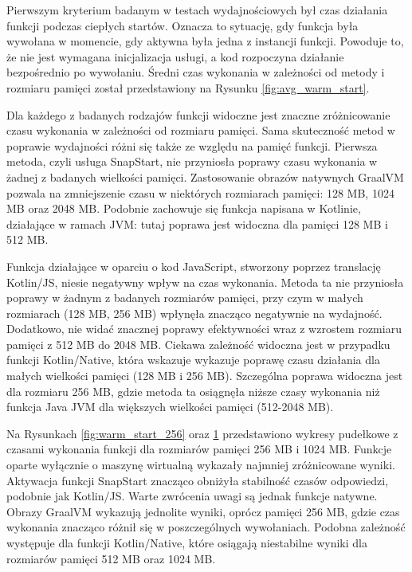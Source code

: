 \begin{figure}[htbp]
\begin{minipage}[t]{0.48\textwidth}
        \label{fig:warm_start_1024} %
    \end{minipage}
\end{figure}

Pierwszym kryterium badanym w testach wydajnościowych był czas działania funkcji podczas ciepłych startów.
Oznacza to sytuację, gdy funkcja była wywołana w momencie, gdy aktywna była jedna z instancji funkcji.
Powoduje to, że nie jest wymagana inicjalizacja usługi, a kod rozpoczyna działanie bezpośrednio po wywołaniu.
Średni czas wykonania w zależności od metody i rozmiaru pamięci został przedstawiony na Rysunku \ref{fig:avg_warm_start}.

Dla każdego z badanych rodzajów funkcji widoczne jest znaczne zróżnicowanie czasu wykonania w zależności od rozmiaru pamięci.
Sama skuteczność metod w poprawie wydajności różni się także ze względu na pamięć funkcji.
Pierwsza metoda, czyli usługa SnapStart, nie przyniosła poprawy czasu wykonania w żadnej z badanych wielkości pamięci.
Zastosowanie obrazów natywnych GraalVM pozwala na zmniejszenie czasu w niektórych rozmiarach pamięci: 128 MB, 1024 MB oraz 2048 MB.
Podobnie zachowuje się funkcja napisana w Kotlinie, działające w ramach JVM: tutaj poprawa jest widoczna dla pamięci 128 MB i 512 MB.

Funkcja działające w oparciu o kod JavaScript, stworzony poprzez translację Kotlin/JS, niesie negatywny wpływ na czas wykonania.
Metoda ta nie przyniosła poprawy w żadnym z badanych rozmiarów pamięci, przy czym w małych rozmiarach (128 MB, 256 MB) wpłynęła znacząco negatywnie na wydajność.
Dodatkowo, nie widać znacznej poprawy efektywności wraz z wzrostem rozmiaru pamięci z 512 MB do 2048 MB. 
Ciekawa zależność widoczna jest w przypadku funkcji Kotlin/Native, która wskazuje wykazuje poprawę czasu działania dla małych wielkości pamięci (128 MB i 256 MB).
Szczególna poprawa widoczna jest dla rozmiaru 256 MB, gdzie metoda ta osiągnęła niższe czasy wykonania niż funkcja Java JVM dla większych wielkości pamięci (512-2048 MB).

Na Rysunkach \ref{fig:warm_start_256} oraz \ref{fig:warm_start_1024} przedstawiono wykresy pudełkowe z czasami wykonania funkcji dla rozmiarów pamięci 256 MB i 1024 MB.
Funkcje oparte wyłącznie o maszynę wirtualną wykazały najmniej zróżnicowane wyniki.
Aktywacja funkcji SnapStart znacząco obniżyła stabilność czasów odpowiedzi, podobnie jak Kotlin/JS.
Warte zwrócenia uwagi są jednak funkcje natywne. 
Obrazy GraalVM wykazują jednolite wyniki, oprócz pamięci 256 MB, gdzie czas wykonania znacząco różnił się w poszczególnych wywołaniach.
Podobna zależność występuje dla funkcji Kotlin/Native, które osiągają niestabilne wyniki dla rozmiarów pamięci 512 MB oraz 1024 MB.

